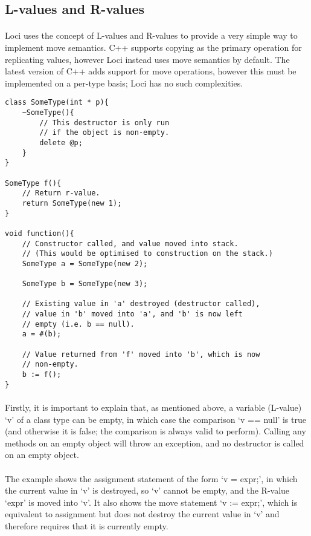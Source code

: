 \documentclass[12pt,twoside,notitlepage]{report}
\begin{document}
\subsection{L-values and R-values}

\paragraph{}
Loci uses the concept of L-values and R-values to provide a very simple way to implement move semantics. C++ supports copying as the primary operation for replicating values, however Loci instead uses move semantics by default. The latest version of C++ adds support for move operations, however this must be implemented on a per-type basis; Loci has no such complexities.

\small{
\begin{verbatim}
class SomeType(int * p){
    ~SomeType(){
        // This destructor is only run
        // if the object is non-empty.
        delete @p;
    }
}

SomeType f(){
    // Return r-value.
    return SomeType(new 1);
}

void function(){
    // Constructor called, and value moved into stack.
    // (This would be optimised to construction on the stack.)
    SomeType a = SomeType(new 2);
    
    SomeType b = SomeType(new 3);
    
    // Existing value in 'a' destroyed (destructor called),
    // value in 'b' moved into 'a', and 'b' is now left
    // empty (i.e. b == null).
    a = #(b);
    
    // Value returned from 'f' moved into 'b', which is now
    // non-empty.
    b := f();
}
\end{verbatim}
}

\paragraph{}
Firstly, it is important to explain that, as mentioned above, a variable (L-value) `v' of a class type can be empty, in which case the comparison `v == null' is true (and otherwise it is false; the comparison is always valid to perform). Calling any methods on an empty object will throw an exception, and no destructor is called on an empty object.

\paragraph{}
The example shows the assignment statement of the form `v = expr;', in which the current value in `v' is destroyed, so `v' cannot be empty, and the R-value `expr' is moved into `v'. It also shows the move statement `v := expr;', which is equivalent to assignment but does not destroy the current value in `v' and therefore requires that it is currently empty.
\end{document}
